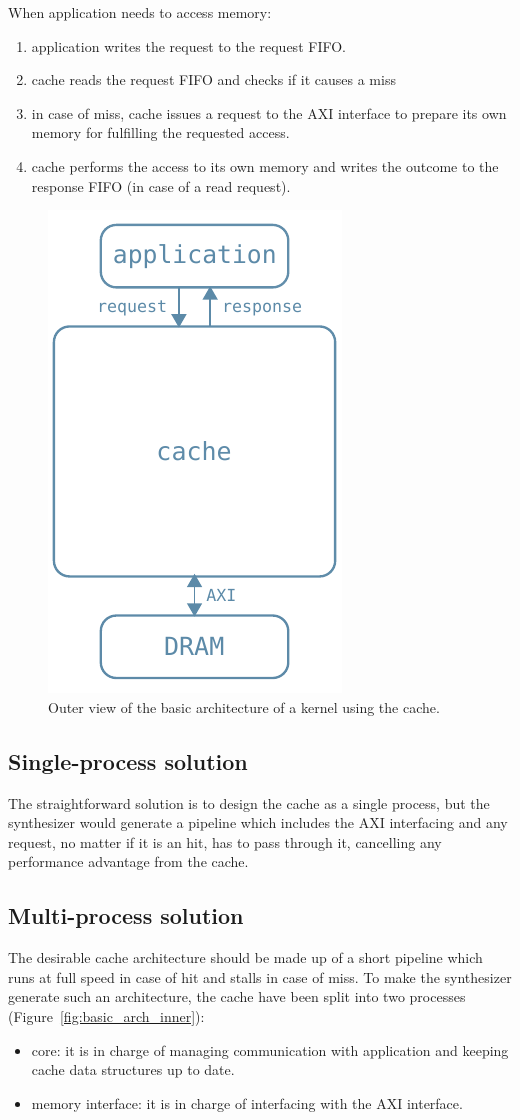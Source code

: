 \documentclass[11pt,a4paper]{memoir}
\begin{document}
When application needs to access memory:
\begin{enumerate}
	\item application writes the request to the request FIFO.
	\item cache reads the request FIFO and checks if it causes a miss
	\item in case of miss, cache issues a request to the AXI interface to
		prepare its own memory for fulfilling the requested access.
	\item cache performs the access to its own memory and writes the outcome
		to the response FIFO (in case of a read request).
\end{enumerate}

\begin{figure}
	\centering
	\includegraphics[width=.3\textwidth]{basic_arch}
	\caption{Outer view of the basic architecture of a kernel using the cache.}
	\label{fig:basic_arch}
\end{figure}

\subsection{Single-process solution}
The straightforward solution is to design the cache as a single process, but
the synthesizer would generate a pipeline which includes the AXI interfacing and
any request, no matter if it is an hit, has to pass through it, cancelling any
performance advantage from the cache.

\subsection{Multi-process solution}
The desirable cache architecture should be made up of a short pipeline which
runs at full speed in case of hit and stalls in case of miss.
To make the synthesizer generate such an architecture, the cache have been split
into two processes (Figure~\ref{fig:basic_arch_inner}):
\begin{itemize}
	\item core: it is in charge of managing communication with application
		and keeping cache data structures up to date.
	\item memory interface: it is in charge of interfacing with the AXI
		interface.
\end{itemize}
\end{document}
